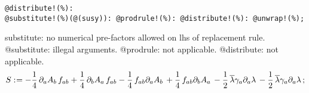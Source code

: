 \documentclass[11pt]{article}
\def\specialcolon{\mathrel{\mathop{:}}\hspace{-.5em}}
\renewcommand{\bar}[1]{\overline{#1}}
\begin{document}
{\color[named]{Blue}\begin{verbatim}
@distribute!(%):
@substitute!(%)(@(susy)): @prodrule!(%): @distribute!(%): @unwrap!(%);
\end{verbatim}}
substitute: no numerical pre-factors allowed on lhs of replacement rule.
@substitute: illegal arguments.
@prodrule: not applicable.
@distribute: not applicable.
\begin{dmath*}[compact, spread=2pt]
S\specialcolon{}=  - \frac{1}{4}\, {\partial}_{a}{{A}_{b}}\,  {f}_{a b} + \frac{1}{4}\, {\partial}_{b}{{A}_{a}}\,  {f}_{a b} - \frac{1}{4}\, {f}_{a b} {\partial}_{a}{{A}_{b}}\,  + \frac{1}{4}\, {f}_{a b} {\partial}_{b}{{A}_{a}}\,  - \frac{1}{2}\, \bar{\lambda} {\gamma}_{a} {\partial}_{a}{\lambda}\,  - \frac{1}{2}\, \bar{\lambda} {\gamma}_{a} {\partial}_{a}{\lambda}\, ;
\end{dmath*}
\end{document}
